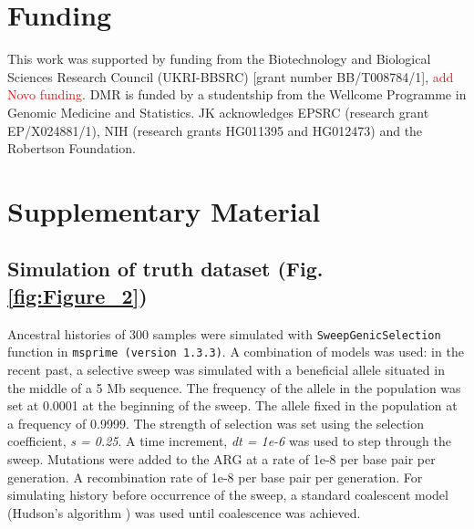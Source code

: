 \documentclass[unnumsec,webpdf,contemporary,large,namedate]{oup-authoring-template}%
\begin{document}

\section*{Funding}
This work was supported by funding from the Biotechnology and Biological
Sciences Research Council (UKRI-BBSRC) [grant number BB/T008784/1],
\textcolor{red}{add Novo funding}. DMR is funded by 
a studentship from the Wellcome Programme in Genomic Medicine and Statistics.
JK acknowledges EPSRC (research grant EP/X024881/1),
NIH (research grants HG011395 and HG012473)
and the Robertson Foundation.




\clearpage \onecolumn \setcounter{figure}{0}
\renewcommand{\thefigure}{S\arabic{figure}}

\section{Supplementary Material}
\subsection{Simulation of truth dataset (Fig. \ref{fig:Figure_2})}
\label{subsec:sweep_simulation}
Ancestral
histories of 300 samples were simulated with \texttt{SweepGenicSelection}
function in \texttt{msprime (version 1.3.3)}. A combination of models was used:
in the recent past, a selective sweep was simulated with a beneficial allele
situated in the middle of a 5 Mb sequence. The frequency of the allele in the
population was set at 0.0001 at the beginning of the sweep. The allele fixed in
the population at a frequency of 0.9999. The strength of selection was set
using the selection coefficient, \textit{s = 0.25}. A time increment,
\textit{dt = 1e-6} was used to step through the sweep. Mutations were added to
the ARG at a rate of 1e-8 per base pair per generation. A recombination rate of 1e-8 per base pair per generation. For simulating history before occurrence of the
sweep, a standard coalescent model (Hudson's algorithm \citep{Hudson1983}) was
used until coalescence was achieved.
\end{document}
